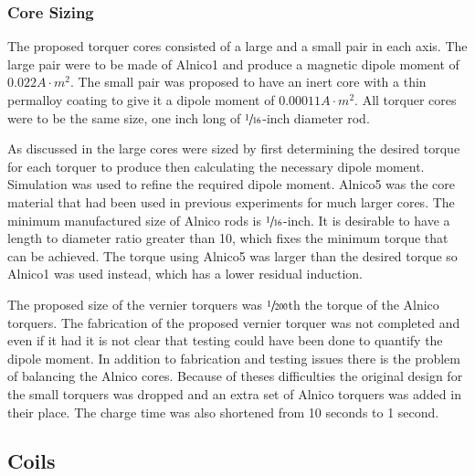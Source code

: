 \subsubsection{Core Sizing}

The proposed torquer cores consisted of a large and a small pair in each axis. The large pair were to be made of Alnico1 and produce a magnetic dipole moment of $0.022 \unit{A \cdot m^2}$. The small pair was proposed to have an inert core with a thin permalloy coating to give it a dipole moment of $0.00011 \unit{A \cdot m^2}$. All torquer cores were to be the same size, one inch long of $\sfrac{1}{16}$-inch diameter rod.

As discussed in \cite{Mentch11} the large cores were sized by first determining the desired torque for each torquer to produce then calculating the necessary dipole moment. Simulation was used to refine the required dipole moment. Alnico5 was the core material that had been used in previous experiments for much larger cores\cite{Mentch11}. The minimum manufactured size of Alnico rods is $\sfrac{1}{16}$-inch. It is desirable to have a length to diameter ratio greater than 10, which fixes the minimum torque that can be achieved. The torque using Alnico5 was larger than the desired torque so Alnico1 was used instead, which has a lower residual induction. 

The proposed size of the vernier torquers was $\sfrac{1}{200}$th the torque of the Alnico torquers. The fabrication of the proposed vernier torquer was not completed and even if it had it is not clear that testing could have been done to quantify the dipole moment. In addition to fabrication and testing issues there is the problem of balancing the Alnico cores. Because of theses difficulties the original design for the small torquers was dropped and an extra set of Alnico torquers was added in their place. The charge time was also shortened from 10 seconds to 1 second.

\subsection{Coils}

